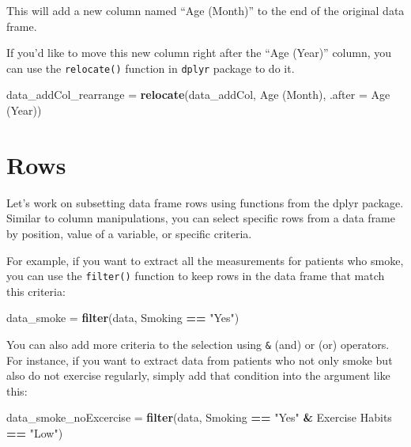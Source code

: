 \documentclass[
]{article}
\newenvironment{Shaded}{\begin{snugshade}}{\end{snugshade}}
\newcommand{\AttributeTok}[1]{\textcolor[rgb]{0.13,0.29,0.53}{#1}}
\newcommand{\FunctionTok}[1]{\textcolor[rgb]{0.13,0.29,0.53}{\textbf{#1}}}
\newcommand{\NormalTok}[1]{#1}
\newcommand{\OtherTok}[1]{\textcolor[rgb]{0.56,0.35,0.01}{#1}}
\newcommand{\SpecialCharTok}[1]{\textcolor[rgb]{0.81,0.36,0.00}{\textbf{#1}}}
\newcommand{\StringTok}[1]{\textcolor[rgb]{0.31,0.60,0.02}{#1}}
\begin{document}
This will add a new column named ``Age (Month)'' to the end of the
original data frame.

If you'd like to move this new column right after the ``Age (Year)''
column, you can use the \texttt{relocate()} function in \texttt{dplyr}
package to do it.

\begin{Shaded}
\begin{Highlighting}[]
\NormalTok{data\_addCol\_rearrange }\OtherTok{=} \FunctionTok{relocate}\NormalTok{(data\_addCol, }\StringTok{\textasciigrave{}}\AttributeTok{Age (Month)}\StringTok{\textasciigrave{}}\NormalTok{, }\AttributeTok{.after =} \StringTok{\textasciigrave{}}\AttributeTok{Age (Year)}\StringTok{\textasciigrave{}}\NormalTok{)}
\end{Highlighting}
\end{Shaded}

\section{Rows}\label{rows}

Let's work on subsetting data frame rows using functions from the dplyr
package. Similar to column manipulations, you can select specific rows
from a data frame by position, value of a variable, or specific
criteria.

For example, if you want to extract all the measurements for patients
who smoke, you can use the \texttt{filter()} function to keep rows in
the data frame that match this criteria:

\begin{Shaded}
\begin{Highlighting}[]
\NormalTok{data\_smoke }\OtherTok{=} \FunctionTok{filter}\NormalTok{(data, Smoking }\SpecialCharTok{==} \StringTok{"Yes"}\NormalTok{)}
\end{Highlighting}
\end{Shaded}

You can also add more criteria to the selection using \texttt{\&} (and)
or \texttt{\textbar{}} (or) operators. For instance, if you want to
extract data from patients who not only smoke but also do not exercise
regularly, simply add that condition into the argument like this:

\begin{Shaded}
\begin{Highlighting}[]
\NormalTok{data\_smoke\_noExcercise }\OtherTok{=} \FunctionTok{filter}\NormalTok{(data, Smoking }\SpecialCharTok{==} \StringTok{"Yes"} \SpecialCharTok{\&} \StringTok{\textasciigrave{}}\AttributeTok{Exercise Habits}\StringTok{\textasciigrave{}} \SpecialCharTok{==} \StringTok{"Low"}\NormalTok{)}
\end{Highlighting}
\end{Shaded}
\end{document}
